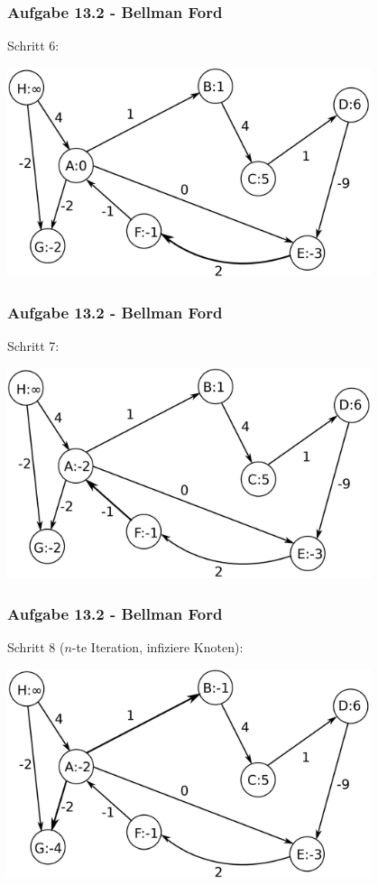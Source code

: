 \documentclass{beamer}
\begin{document}
\begin{frame}
	\frametitle{Aufgabe 13.2 - Bellman Ford}
	Schritt 6:
	\begin{center}
		\includegraphics[width=0.8\textwidth]{images/bellman_ford5.png}
	\end{center}
\end{frame}

\begin{frame}
	\frametitle{Aufgabe 13.2 - Bellman Ford}
	Schritt 7:
	\begin{center}
		\includegraphics[width=0.8\textwidth]{images/bellman_ford6.png}
	\end{center}
\end{frame}

\begin{frame}
	\frametitle{Aufgabe 13.2 - Bellman Ford}
	Schritt 8 ($n$-te Iteration, infiziere Knoten):
	\begin{center}
		\includegraphics[width=0.8\textwidth]{images/bellman_ford7.png}
	\end{center}
\end{frame}
\end{document}
